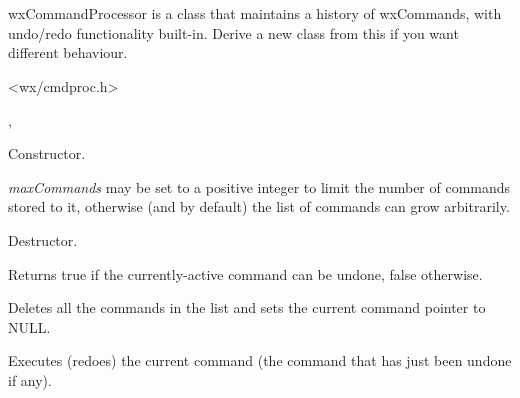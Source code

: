 \section{}\label{wxcommandprocessor}

wxCommandProcessor is a class that maintains a history of wxCommands,
with undo/redo functionality built-in. Derive a new class from this
if you want different behaviour.




<wx/cmdproc.h>


, 




Constructor.

{\it maxCommands} may be set to a positive integer to limit the number of
commands stored to it, otherwise (and by default) the list of commands can grow
arbitrarily.



Destructor.



Returns true if the currently-active command can be undone, false otherwise.



Deletes all the commands in the list and sets the current command pointer to NULL.



Executes (redoes) the current command (the command that has just been undone if any).


